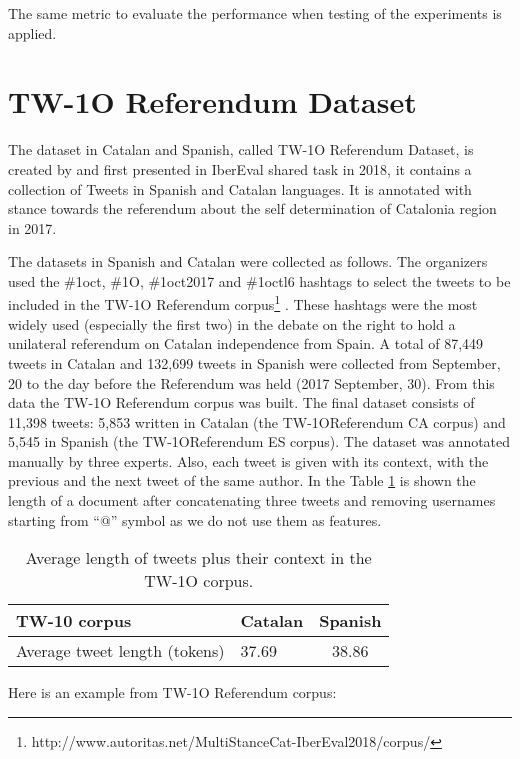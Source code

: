 \documentclass[10pt, a4paper]{article}
\begin{document}
The same metric to evaluate the performance when testing of the experiments is applied.

\section{TW-1O Referendum Dataset}\label{sec:tw1o_dataset}

The dataset in Catalan and Spanish, called TW-1O Referendum Dataset, is created by \cite{taule18} and first presented in IberEval shared task in 2018, it contains a collection of Tweets in Spanish and Catalan languages. It is annotated with stance towards the referendum about the self determination of Catalonia region in 2017.

The datasets in Spanish and Catalan were collected as follows. The organizers used the \#1oct, \#1O, \#1oct2017 and \#1octl6 hashtags to select the tweets to be included in the TW-1O Referendum corpus\footnote{http://www.autoritas.net/MultiStanceCat-IberEval2018/corpus/} \cite{taule18}. These hashtags were the most widely used (especially the first two) in the debate on the right to hold a unilateral referendum on Catalan independence from Spain. A total of 87,449 tweets in Catalan and 132,699 tweets in Spanish were collected from September, 20 to the day before the Referendum was held (2017 September, 30). From this data the TW-1O Referendum corpus was built. The final dataset consists of 11,398 tweets: 5,853 written in Catalan (the TW-1OReferendum CA corpus) and 5,545 in Spanish (the TW-1OReferendum ES corpus). The dataset was annotated manually by three experts. Also, each tweet is given with its context, with the previous and the next tweet of the same author. In the Table \ref{tab:length_tw_dataset} is shown the length of a document after concatenating three tweets and removing usernames starting from ``@'' symbol as we do not use them as features.

\begin{table}[!ht]
\begin{tabular}{llc} \hline
  TW-10 corpus & Catalan & Spanish \\ \hline
  Average tweet length (tokens) & 37.69 & 38.86\\ \hline
\end{tabular}
\caption{Average length of tweets plus their context in the TW-1O corpus.}\label{tab:length_tw_dataset}
\end{table}


Here is an example from TW-1O Referendum corpus:
\end{document}
